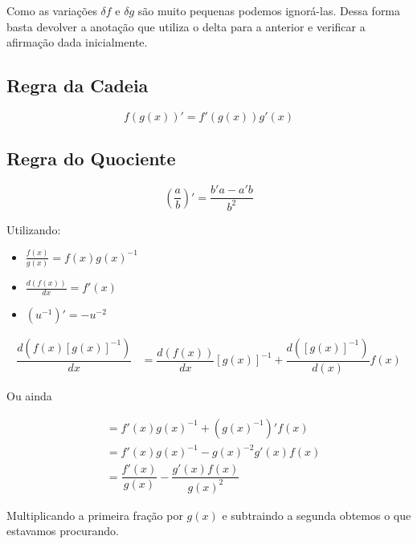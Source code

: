 Como as variações $\delta f$ e $\delta g$ são muito pequenas podemos ignorá-las. Dessa forma basta devolver a anotação que utiliza o delta para a anterior e verificar a afirmação dada inicialmente.

\subsection{Regra da Cadeia}


\begin{equation}\label{5.8}
f(g(x))'=f'(g(x))g'(x)
\end{equation}



\subsection{Regra do Quociente}

\begin{equation}\label{5.9}
\left( \dfrac{a}{b} \right)'=\dfrac{b'a-a'b}{b^2}
\end{equation}


Utilizando:

\begin{itemize}
\item $\frac{f(x)}{g(x)}=f(x)g(x)^{-1}$
\item $\frac{d(f(x))}{dx}=f'(x)$
\item $(u^{-1})'=-u^{-2}$
\end{itemize}

\begin{align*}
    \dfrac{d(f(x)[g(x)]^{-1})}{dx}&=\dfrac{d(f(x))}{dx}[g(x)]^{-1}+\dfrac{d([g(x)]^{-1})}{d(x)}f(x)
\end{align*}

Ou ainda

\begin{align*}
    &=f'(x)g(x)^{-1}+(g(x)^{-1})'f(x)\\
    &=f'(x)g(x)^{-1}-g(x)^{-2}g'(x)f(x)\\
    &=\dfrac{f'(x)}{g(x)}-\dfrac{g'(x)f(x)}{g(x)^2}
\end{align*}

Multiplicando a primeira fração por $g(x)$ e subtraindo a segunda obtemos o que estavamos procurando.

